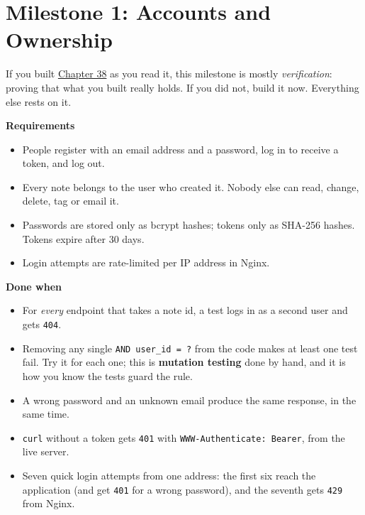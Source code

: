 \setcounter{section}{1}
\section{Milestone 1: Accounts and Ownership}\label{44-project-notes-for-many-users:442-milestone-1-accounts-and-ownership}

If you built \hyperref[ch:38-security]{Chapter 38} as you read it, this milestone is mostly \emph{verification}: proving that what you built really holds. If you did not, build it now. Everything else rests on it.

\textbf{Requirements}

\begin{itemize}
\tightlist
\item
  People register with an email address and a password, log in to receive a token, and log out.
\item
  Every note belongs to the user who created it. Nobody else can read, change, delete, tag or email it.
\item
  Passwords are stored only as bcrypt hashes; tokens only as SHA-256 hashes. Tokens expire after 30 days.
\item
  Login attempts are rate-limited per IP address in Nginx.
\end{itemize}

\noindent{}\textbf{Done when}

\begin{itemize}
\item[$\square$]
  For \emph{every} endpoint that takes a note id, a test logs in as a second user and gets \texttt{404}.
\item[$\square$]
  Removing any single \texttt{AND\ user\_id\ =\ ?} from the code makes at least one test fail. Try it for each one; this is \textbf{mutation testing} done by hand, and it is how you know the tests guard the rule.
\item[$\square$]
  A wrong password and an unknown email produce the same response, in the same time.
\item[$\square$]
  \texttt{curl} without a token gets \texttt{401} with \texttt{WWW-}\allowbreak{}\texttt{Authenticate:}\allowbreak{}\texttt{\ Bearer}, from the live server.
\item[$\square$]
  Seven quick login attempts from one address: the first six reach the application (and get \texttt{401} for a wrong password), and the seventh gets \texttt{429} from Nginx.
\end{itemize}

